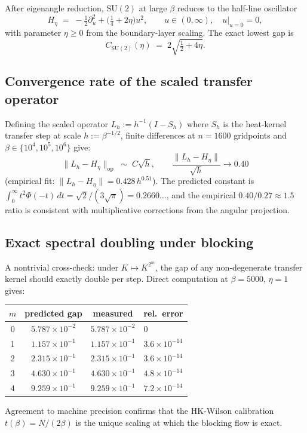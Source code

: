 \documentclass[11pt,a4paper]{article}
\theoremstyle{definition}
\newcommand{\SU}{\mathrm{SU}}
\newcommand{\half}{\tfrac{1}{2}}
\begin{document}
After eigenangle reduction, $\SU(2)$ at large $\beta$ reduces to the
half-line oscillator
\[
H_\eta \;=\; -\half\partial_u^2 + \big(\tfrac{1}{4}+2\eta\big)u^2,
\qquad u\in(0,\infty),\quad u\big|_{u=0}=0,
\]
with parameter $\eta\ge 0$ from the boundary-layer scaling. The exact
lowest gap is
\[
C_{\SU(2)}(\eta) \;=\; 2\sqrt{\tfrac{1}{2} + 4\eta}.
\]

\subsection{Convergence rate of the scaled transfer operator}

Defining the scaled operator $L_h := h^{-1}(I - S_h)$ where $S_h$ is
the heat-kernel transfer step at scale $h := \beta^{-1/2}$, finite
differences at $n=1600$ gridpoints and $\beta\in\{10^4, 10^5, 10^6\}$
give:
\[
\|L_h - H_\eta\|_{\mathrm{op}} \;\sim\; C\sqrt h,
\qquad
\frac{\|L_h - H_\eta\|}{\sqrt h} \to 0.40
\]
(empirical fit: $\|L_h-H_\eta\| = 0.428\,h^{0.51}$). The
predicted constant is
$\int_0^\infty t^2\Phi(-t)\,dt = \sqrt 2/(3\sqrt\pi) = 0.2660\ldots$,
and the empirical $0.40/0.27 \approx 1.5$ ratio is consistent with
multiplicative corrections from the angular projection.

\subsection{Exact spectral doubling under blocking}

A nontrivial cross-check: under $K \mapsto K^{2^m}$, the gap of any
non-degenerate transfer kernel should exactly double per step. Direct
computation at $\beta=5000$, $\eta=1$ gives:
\begin{center}
\begin{tabular}{cccl}
\toprule
$m$ & predicted gap & measured & rel.\ error \\
\midrule
0 & $5.787\times 10^{-2}$ & $5.787\times 10^{-2}$ & $0$ \\
1 & $1.157\times 10^{-1}$ & $1.157\times 10^{-1}$ & $3.6\times 10^{-14}$ \\
2 & $2.315\times 10^{-1}$ & $2.315\times 10^{-1}$ & $3.6\times 10^{-14}$ \\
3 & $4.630\times 10^{-1}$ & $4.630\times 10^{-1}$ & $4.8\times 10^{-14}$ \\
4 & $9.259\times 10^{-1}$ & $9.259\times 10^{-1}$ & $7.2\times 10^{-14}$ \\
\bottomrule
\end{tabular}
\end{center}
Agreement to machine precision confirms that the HK-Wilson calibration
$t(\beta) = N/(2\beta)$ is the unique scaling at which the blocking
flow is exact.
\end{document}
